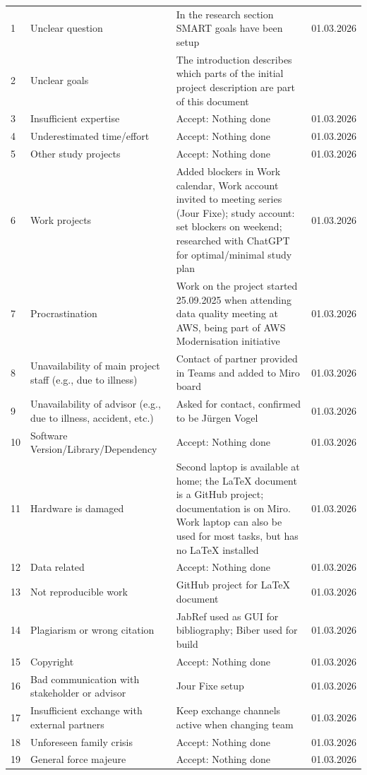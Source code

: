 \begin{longtable}{@{}C{1cm}L{3.5cm}L{9cm}C{2.5cm}@{}}
1  & Unclear question & In the research section SMART goals have been setup & 01.03.2026 \\
2  & Unclear goals & The introduction describes which parts of the initial project description are part of this document &  \\
3  & Insufficient expertise & Accept: Nothing done & 01.03.2026 \\
4  & Underestimated time/effort & Accept: Nothing done & 01.03.2026 \\
5  & Other study projects & Accept: Nothing done & 01.03.2026 \\
6  & Work projects & Added blockers in Work calendar, Work account invited to meeting series (Jour Fixe); study account: set blockers on weekend; researched with ChatGPT for optimal/minimal study plan & 01.03.2026 \\
7  & Procrastination & Work on the project started 25.09.2025 when attending data quality meeting at AWS, being part of AWS Modernisation initiative & 01.03.2026 \\
8  & Unavailability of main project staff (e.g., due to illness) & Contact of partner provided in Teams and added to Miro board & 01.03.2026 \\
9  & Unavailability of advisor (e.g., due to illness, accident, etc.) & Asked for contact, confirmed to be Jürgen Vogel & 01.03.2026 \\
10 & Software Version/Library/Dependency & Accept: Nothing done & 01.03.2026 \\
11 & Hardware is damaged & Second laptop is available at home; the LaTeX document is a GitHub project; documentation is on Miro. Work laptop can also be used for most tasks, but has no LaTeX installed & 01.03.2026 \\
12 & Data related & Accept: Nothing done & 01.03.2026 \\
13 & Not reproducible work & GitHub project for LaTeX document & 01.03.2026 \\
14 & Plagiarism or wrong citation & JabRef used as GUI for bibliography; Biber used for build & 01.03.2026 \\
15 & Copyright & Accept: Nothing done & 01.03.2026 \\
16 & Bad communication with stakeholder or advisor & Jour Fixe setup & 01.03.2026 \\
17 & Insufficient exchange with external partners & Keep exchange channels active when changing team & 01.03.2026 \\
18 & Unforeseen family crisis & Accept: Nothing done & 01.03.2026 \\
19 & General force majeure & Accept: Nothing done & 01.03.2026 \\

\end{longtable}

